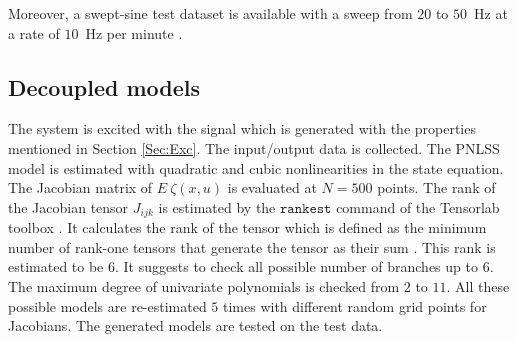 \documentclass[review]{elsarticle}
\begin{document}
Moreover, a swept-sine test dataset is available with a sweep from $20$ to $50$~Hz at a rate of $10$~Hz per minute \citep{Maarten}.
\subsection{Decoupled models}
The system is excited with the signal which is generated with the properties mentioned in Section \ref{Sec:Exc}. The input/output data is collected. The PNLSS model is estimated with quadratic and cubic nonlinearities in the state equation. The Jacobian matrix of $E \ \zeta (x,u)$  is evaluated at $N = 500$ points. The rank of the Jacobian tensor $J_{ijk}$ is estimated by the $\texttt{rankest}$ command of the Tensorlab toolbox \citep{TensorLab}. It calculates the rank of the tensor which is defined as the minimum number of rank-one tensors that generate the tensor as their sum \citep{Kolda}. This rank is estimated to be $6$. It suggests to check all possible number of branches up to $6$. The maximum degree of univariate polynomials is checked from $2$ to $11$. All these possible models are re-estimated $5$ times with different random grid points for Jacobians. The generated models are tested on the test data.
\end{document}
